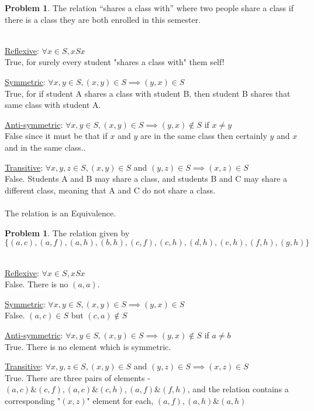 \documentclass[10pt,leqno ]{article}
\theoremstyle{definition}
\newtheorem{problem}[theorem]{Problem}
\begin{document}
\begin{problem} The relation “shares a class with” where two people share a class if there is a class they are both enrolled in this semester.
\\\\
\Large
\item \underline{Reflexive}: $\forall x \in S, x S x$\\
True, for surely every student "shares a class with" them self!\\
\item \underline{Symmetric}: $\forall x,y \in S, (x, y) \in S \implies (y, x) \in S$\\
True, for if student A shares a class with student B, then student B shares that same class with student A.\\
\item \underline{Anti-symmetric}: $\forall x,y \in S, (x, y) \in S \implies (y, x) \notin S$ if $x \neq y$\\
False since it must be that if $x$ and $y$ are in the same class then certainly $y$ and $x$ and in the same class..\\
\item \underline{Transitive}: $\forall x,y,z \in S, (x, y) \in S$ and $(y, z) \in S \implies (x, z) \in S$\\
False.   Students A and B may share a class, and students B and C may share a different class, meaning that A and C do not share a class.
\\\\
The relation is an Equivalence.
\end{problem}
\newpage

\begin{problem} The relation given by $\{(a, c),(a, f),(a, h),(b, h),(c, f),(c, h),(d, h),(e, h),(f, h),(g, h)\}$
\\\\
\Large
\item \underline{Reflexive}: $\forall x \in S, x S x$\\
False.  There is no $(a, a)$. \\
\item \underline{Symmetric}: $\forall x,y \in S, (x, y) \in S \implies (y, x) \in S$\\
False.  $(a, c) \in S$ but $(c, a) \notin S$\\
\item \underline{Anti-symmetric}: $\forall x,y \in S, (x, y) \in S \implies (y, x) \notin S$ if $a \neq b$\\
True. There is no element which is symmetric.\\
\item \underline{Transitive}: $\forall x,y,z \in S, (x, y) \in S$ and $(y, z) \in S \implies (x, z) \in S$\\
True.  There are three pairs of elements - $(a, c) \& (c, f), (a, c) \& (c, h), (a, f) \& (f, h)$, and the relation contains a corresponding "$(x, z)$" element for each, $(a, f), (a, h) \& (a, h)$
\end{problem}
\newpage
\end{document}
